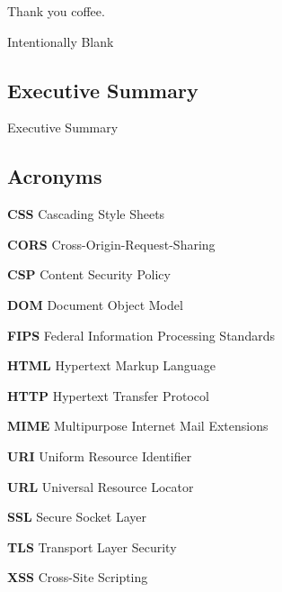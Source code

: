 \documentclass{mscreport}
\begin{document}
Thank you coffee.

\newpage

\setcounter{page}{1}
\vspace*{\fill}
\begin{center}
\begin{huge}
Intentionally Blank
\end{huge}
\end{center}
\vspace{\fill}

\newpage

\begin{center}
\section*{Executive Summary}
\end{center}

Executive Summary 

\newpage
\begin{center}
\section*{Acronyms}
\end{center}


\noindent \textbf{CSS} Cascading Style Sheets \par
\noindent \textbf{CORS} Cross-Origin-Request-Sharing \par
\noindent \textbf{CSP} Content Security Policy \par
\vspace{0.5cm}
\noindent \textbf{DOM} Document Object Model \par
\vspace{0.5cm}
\noindent \textbf{FIPS} Federal Information Processing Standards \par
\vspace{0.5cm}
\noindent \textbf{HTML} Hypertext Markup Language \par
\noindent \textbf{HTTP} Hypertext Transfer Protocol \par
\vspace{0.5cm}
\noindent \textbf{MIME} Multipurpose Internet Mail Extensions \par
\vspace{0.5cm}
\noindent \textbf{URI} Uniform Resource Identifier \par
\noindent \textbf{URL} Universal Resource Locator \par
\vspace{0.5cm}
\noindent \textbf{SSL} Secure Socket Layer \par
\vspace{0.5cm}
\noindent \textbf{TLS} Transport Layer Security \par
\vspace{0.5cm}
\noindent \textbf{XSS} Cross-Site Scripting \par
\end{document}
